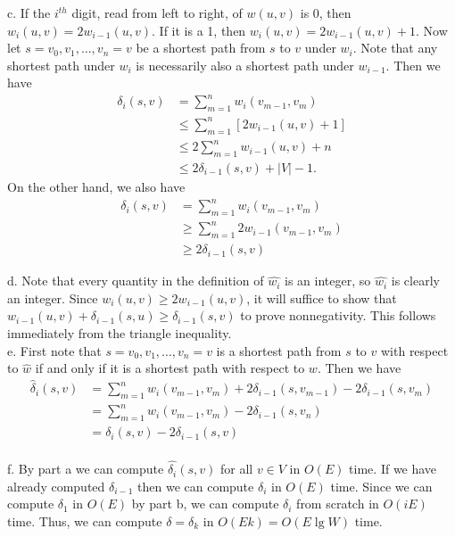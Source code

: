 \documentclass{article}
\begin{document}
c. If the $i^{th}$ digit, read from left to right, of $w(u,v)$ is 0, then $w_i(u,v) = 2w_{i-1}(u,v)$.  If it is a 1, then $w_i(u,v) = 2w_{i-1}(u,v)+1$.  Now let $s = v_0, v_1, \ldots, v_n = v$ be a shortest path from $s$ to $v$ under $w_i$.  Note that any shortest path under $w_i$ is necessarily also a shortest path under $w_{i-1}$.  Then we have
\begin{align*}
\delta_i(s,v) &= \sum_{m=1}^n w_i(v_{m-1}, v_m) \\
&\leq  \sum_{m=1}^n [2w_{i-1}(u,v) + 1] \\
&\leq 2\sum_{m=1}^n w_{i-1}(u,v) + n \\
&\leq 2\delta_{i-1}(s,v) + |V| - 1.
\end{align*}
On the other hand, we also have 
\begin{align*}
\delta_i(s,v) &= \sum_{m=1}^n w_i(v_{m-1}, v_m) \\
&\geq \sum_{m=1}^n 2w_{i-1}(v_{m-1}, v_m) \\
&\geq 2\delta_{i-1}(s,v)
\end{align*}

d. Note that every quantity in the definition of $\hat{w_i}$ is an integer, so $\hat{w_i}$ is clearly an integer.  Since $w_i(u,v) \geq 2w_{i-1}(u,v)$, it will suffice to show that $w_{i-1}(u,v) + \delta_{i-1}(s,u) \geq \delta_{i-1}(s,v)$ to prove nonnegativity.  This follows immediately from the triangle inequality. \\

e. First note that $s=v_0, v_1, \ldots, v_n = v$ is a shortest path from $s$ to $v$ with respect to $\hat{w}$ if and only if it is a shortest path with respect to $w$.  Then we have
\begin{align*}
\hat{\delta}_i(s,v) &= \sum_{m=1}^n w_i(v_{m-1}, v_m) + 2\delta_{i-1}(s,v_{m-1}) - 2\delta_{i-1}(s, v_m) \\
&=  \sum_{m=1}^n w_i(v_{m-1}, v_m) - 2\delta_{i-1}(s,v_n) \\
&= \delta_i(s,v) - 2\delta_{i-1}(s,v)
\end{align*}
\\

f. By part a we can compute $\hat{\delta_i}(s,v)$ for all $v \in V$ in $O(E)$ time.  If we have already computed $\delta_{i-1}$ then we can compute $\delta_i$ in $O(E)$ time.  Since we can compute $\delta_1$ in $O(E)$ by part b, we can compute $\delta_i$ from scratch in $O(iE)$ time.  Thus, we can compute $\delta = \delta_k$ in $O(Ek) = O(E\lg W)$ time. \\
\end{document}
